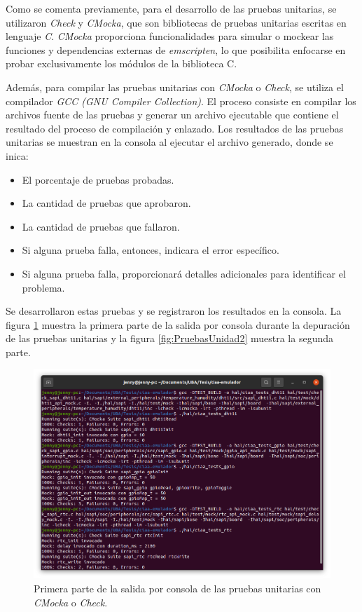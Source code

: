 Como se comenta previamente, para el desarrollo de las pruebas unitarias, se utilizaron \textit{Check} y \textit{CMocka}, que son bibliotecas de pruebas unitarias escritas en lenguaje \textit{C}. \textit{CMocka} proporciona funcionalidades para simular o mockear las funciones y dependencias externas de \textit{emscripten}, lo que posibilita enfocarse en probar exclusivamente los módulos de la biblioteca C.

Además, para compilar las pruebas unitarias con \textit{CMocka} o \textit{Check}, se utiliza el compilador \textit{GCC (GNU Compiler Collection)}. El proceso consiste en compilar los archivos fuente de las pruebas y generar un archivo ejecutable que contiene el resultado del proceso de compilación y enlazado. Los resultados de las pruebas unitarias se muestran en la consola al ejecutar el archivo generado, donde se inica:

\begin{itemize}
	\item El porcentaje de pruebas probadas.
	\item La cantidad de pruebas que aprobaron.
	\item La cantidad de pruebas que fallaron.
	\item Si alguna prueba falla, entonces, indicara el error específico.
	\item Si alguna prueba falla, proporcionará detalles adicionales para identificar el problema.
\end{itemize}

Se desarrollaron estas pruebas y se registraron los resultados en la consola. La figura \ref{fig:PruebasUnidad1} muestra la primera parte de la salida por consola durante la depuración de las pruebas unitarias y la figura \ref{fig:PruebasUnidad2} muestra la segunda parte.

\begin{figure}[ht]
	\centering
	\includegraphics[scale=.27]{./Figures/PruebasUnidad1.png}
	\caption{Primera parte de la salida por consola de las pruebas unitarias con \textit{CMocka} o \textit{Check}.}
	\label{fig:PruebasUnidad1}
\end{figure}

